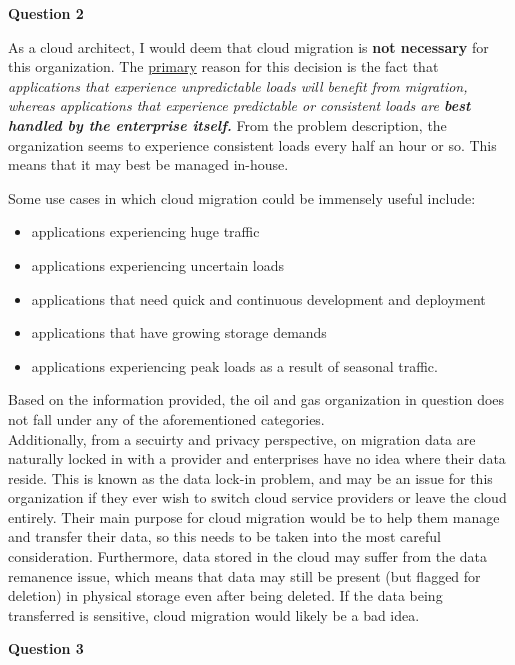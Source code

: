 \documentclass[a4paper, 12pt]{article}
\begin{document}
\newpage
\begin{center}
	\textbf{Question 2}
\end{center}
As a cloud architect, I would deem that cloud migration is \textbf{not necessary} for this organization. The \underline{primary} reason for this decision is the fact that \textit{applications that experience unpredictable loads will benefit from migration, whereas applications that experience predictable or consistent loads are \textbf{best handled by the enterprise itself.}} 
From the problem description, the organization seems to experience consistent loads every half an hour or so. This means that it may best be managed in-house.

Some use cases in which cloud migration could be immensely useful include:
\begin{itemize}
\item
applications experiencing huge traffic
\item
applications experiencing uncertain loads
\item
applications that need quick and continuous development and deployment
\item
applications that have growing storage demands
\item
applications experiencing peak loads as a result of seasonal traffic.
\end{itemize}

Based on the information provided, the oil and gas organization in question does not fall under any of the aforementioned categories. \\
Additionally, from a secuirty and privacy perspective, on migration data are naturally locked in with a provider and enterprises have no idea where their data reside. This is known as the data lock-in problem, and may be an issue for this organization if they ever wish to switch cloud service providers or leave the cloud entirely. Their main purpose for cloud migration would be to help them manage and transfer their data, so this needs to be taken into the most careful consideration. Furthermore, data stored in the cloud may suffer from the data remanence issue, which means that data may still be present (but flagged for deletion) in physical storage even after being deleted. If the data being transferred is sensitive, cloud migration would likely be a bad idea. 

\newpage
\begin{center}
	\textbf{Question 3}
\end{center}
\end{document}
